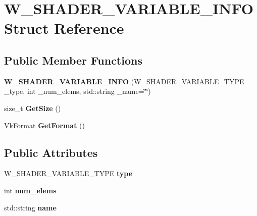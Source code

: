 \hypertarget{struct_w___s_h_a_d_e_r___v_a_r_i_a_b_l_e___i_n_f_o}{}\section{W\+\_\+\+S\+H\+A\+D\+E\+R\+\_\+\+V\+A\+R\+I\+A\+B\+L\+E\+\_\+\+I\+N\+FO Struct Reference}
\label{struct_w___s_h_a_d_e_r___v_a_r_i_a_b_l_e___i_n_f_o}
\subsection*{Public Member Functions}
\begin{DoxyCompactItemize}
\item 
{\bfseries W\+\_\+\+S\+H\+A\+D\+E\+R\+\_\+\+V\+A\+R\+I\+A\+B\+L\+E\+\_\+\+I\+N\+FO} (W\+\_\+\+S\+H\+A\+D\+E\+R\+\_\+\+V\+A\+R\+I\+A\+B\+L\+E\+\_\+\+T\+Y\+PE \+\_\+type, int \+\_\+num\+\_\+elems, std\+::string \+\_\+name=\char`\"{}\char`\"{})\hypertarget{struct_w___s_h_a_d_e_r___v_a_r_i_a_b_l_e___i_n_f_o_a7146ac62a2911ba861d9661debb7fac5}{}\label{struct_w___s_h_a_d_e_r___v_a_r_i_a_b_l_e___i_n_f_o_a7146ac62a2911ba861d9661debb7fac5}

\item 
size\+\_\+t {\bfseries Get\+Size} ()\hypertarget{struct_w___s_h_a_d_e_r___v_a_r_i_a_b_l_e___i_n_f_o_aa18e0f7e7d80c98ddcbaeaa55649fc22}{}\label{struct_w___s_h_a_d_e_r___v_a_r_i_a_b_l_e___i_n_f_o_aa18e0f7e7d80c98ddcbaeaa55649fc22}

\item 
Vk\+Format {\bfseries Get\+Format} ()\hypertarget{struct_w___s_h_a_d_e_r___v_a_r_i_a_b_l_e___i_n_f_o_ab9e7bb852fada1b45ec4af82d30cb484}{}\label{struct_w___s_h_a_d_e_r___v_a_r_i_a_b_l_e___i_n_f_o_ab9e7bb852fada1b45ec4af82d30cb484}

\end{DoxyCompactItemize}
\subsection*{Public Attributes}
\begin{DoxyCompactItemize}
\item 
W\+\_\+\+S\+H\+A\+D\+E\+R\+\_\+\+V\+A\+R\+I\+A\+B\+L\+E\+\_\+\+T\+Y\+PE {\bfseries type}\hypertarget{struct_w___s_h_a_d_e_r___v_a_r_i_a_b_l_e___i_n_f_o_a8dd6afc8a043c57343a7e401dffaaa0b}{}\label{struct_w___s_h_a_d_e_r___v_a_r_i_a_b_l_e___i_n_f_o_a8dd6afc8a043c57343a7e401dffaaa0b}

\item 
int {\bfseries num\+\_\+elems}\hypertarget{struct_w___s_h_a_d_e_r___v_a_r_i_a_b_l_e___i_n_f_o_a76488ce65cd829ddc892ebd86560b889}{}\label{struct_w___s_h_a_d_e_r___v_a_r_i_a_b_l_e___i_n_f_o_a76488ce65cd829ddc892ebd86560b889}

\item 
std\+::string {\bfseries name}\hypertarget{struct_w___s_h_a_d_e_r___v_a_r_i_a_b_l_e___i_n_f_o_a6c7ea051bec0e855ef7531ac619eacc4}{}\label{struct_w___s_h_a_d_e_r___v_a_r_i_a_b_l_e___i_n_f_o_a6c7ea051bec0e855ef7531ac619eacc4}

\end{DoxyCompactItemize}


